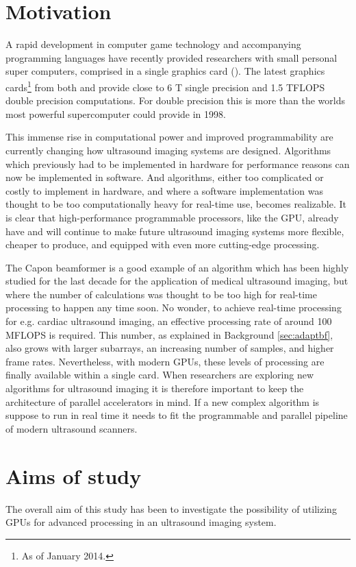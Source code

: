 \section{Motivation}
A rapid development in computer game technology and accompanying programming languages have recently provided researchers with small personal super computers, comprised in a single graphics card (). The latest graphics cards\footnote{As of January 2014.} from both  and  provide close to 6 T single precision and 1.5 TFLOPS double precision computations. For double precision this is more than the worlds most powerful supercomputer could provide in 1998.

This immense rise in computational power and improved programmability are currently changing how ultrasound imaging systems are designed. Algorithms which previously had to be implemented in hardware for performance reasons can now be implemented in software. And algorithms, either too complicated or costly to implement in hardware, and where a software implementation was thought to be too computationally heavy for real-time use, becomes realizable. It is clear that high-performance programmable processors, like the GPU, already have and will continue to make future ultrasound imaging systems more flexible, cheaper to produce, and equipped with even more cutting-edge processing.

The Capon beamformer  is a good example of an algorithm which has been highly studied for the last decade for the application of medical ultrasound imaging, but where the number of calculations was thought to be too high for real-time processing to happen any time soon. No wonder, to achieve real-time processing for e.g. cardiac ultrasound imaging, an effective processing rate of around 100 MFLOPS is required. This number, as explained in Background \ref{sec:adaptbf}, also grows with larger subarrays, an increasing number of samples, and higher frame rates.  Nevertheless, with modern GPUs, these levels of processing are finally available within a single card. When researchers are exploring new algorithms for ultrasound imaging it is therefore important to keep the architecture of parallel accelerators in mind. If a new complex algorithm is suppose to run in real time it needs to fit the programmable and parallel pipeline of modern ultrasound scanners.

\section{Aims of study}
The overall aim of this study has been to investigate the possibility of utilizing GPUs for advanced processing in an ultrasound imaging system. 

